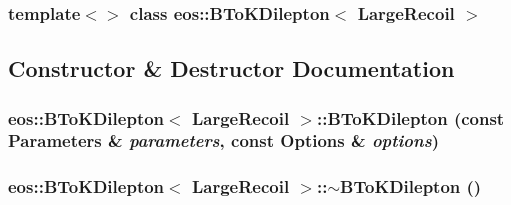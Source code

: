 \subsubsection*{template$<$$>$ class eos::BToKDilepton$<$ LargeRecoil $>$}



\subsection{Constructor \& Destructor Documentation}
\hypertarget{classeos_1_1BToKDilepton_3_01LargeRecoil_01_4_ae24a0041ca988880b7835a61987a6c98}{
\subsubsection[{BToKDilepton}]{\setlength{\rightskip}{0pt plus 5cm}eos::BToKDilepton$<$ {\bf LargeRecoil} $>$::BToKDilepton (const {\bf Parameters} \& {\em parameters}, \/  const {\bf Options} \& {\em options})}}
\label{classeos_1_1BToKDilepton_3_01LargeRecoil_01_4_ae24a0041ca988880b7835a61987a6c98}
\hypertarget{classeos_1_1BToKDilepton_3_01LargeRecoil_01_4_a8f7f6c37355d48b92dcf73127ce7b603}{
\subsubsection[{$\sim$BToKDilepton}]{\setlength{\rightskip}{0pt plus 5cm}eos::BToKDilepton$<$ {\bf LargeRecoil} $>$::$\sim$BToKDilepton ()}}
\label{classeos_1_1BToKDilepton_3_01LargeRecoil_01_4_a8f7f6c37355d48b92dcf73127ce7b603}


